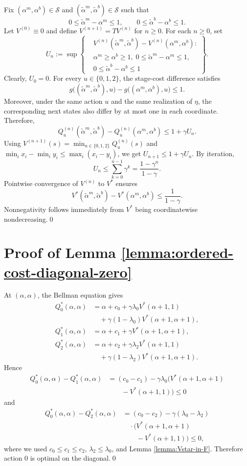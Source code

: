 \documentclass[letterpaper,journal]{IEEEtran}
\begin{document}
Fix $(\alpha^m,\alpha^b)\in\mathcal S$ and $(\tilde\alpha^m,\tilde\alpha^b)\in\mathcal S$ such that
\[
0\leq \tilde\alpha^m-\alpha^m\leq 1,\qquad 0\leq \tilde\alpha^b-\alpha^b\leq 1.
\]
Let $V^{(0)}\equiv 0$ and define $V^{(n+1)}=TV^{(n)}$ for $n\geq 0$. For each $n\geq 0$, set
\[
U_n:=\sup\left\{
\begin{aligned}
&V^{(n)}(\tilde\alpha^m,\tilde\alpha^b)-V^{(n)}(\alpha^m,\alpha^b):\\
&\alpha^m\geq \alpha^b\geq 1,\;
0\leq \tilde\alpha^m-\alpha^m\leq 1,\\
&0\leq \tilde\alpha^b-\alpha^b\leq 1
\end{aligned}
\right\}.
\]
Clearly, $U_0=0$. For every $u\in\{0,1,2\}$, the stage-cost difference satisfies
\[
g\bigl((\tilde\alpha^m,\tilde\alpha^b),u\bigr)-g\bigl((\alpha^m,\alpha^b),u\bigr)\leq 1.
\]
Moreover, under the same action $u$ and the same realization of $\eta$, the corresponding next states also differ by at most one in each coordinate. Therefore,
\[
Q_u^{(n)}(\tilde\alpha^m,\tilde\alpha^b)-Q_u^{(n)}(\alpha^m,\alpha^b)\leq 1+\gamma U_n.
\]
Using $V^{(n+1)}(s)=\min_{u\in\{0,1,2\}} Q_u^{(n)}(s)$ and $\min_i x_i-\min_i y_i\leq \max_i (x_i-y_i)$, we get $U_{n+1}\leq 1+\gamma U_n$. By iteration,
\[
U_n\leq \sum_{k=0}^{n-1}\gamma^k=\frac{1-\gamma^n}{1-\gamma}.
\]
Pointwise convergence of $V^{(n)}$ to $V^*$ ensures
\[
V^*(\tilde\alpha^m,\tilde\alpha^b)-V^*(\alpha^m,\alpha^b)\leq \frac{1}{1-\gamma}.
\]
Nonnegativity follows immediately from $V^*$ being coordinatewise nondecreasing.\qed


\section{Proof of Lemma \ref{lemma:ordered-cost-diagonal-zero}}
\label{app:ordered-cost-diagonal-zero}


At $(\alpha,\alpha)$, the Bellman equation gives
\begin{align*}
Q_0^*(\alpha,\alpha)
&=\alpha+c_0+\gamma\lambda_0V^*(\alpha+1,1)\\
&\quad+\gamma(1-\lambda_0)V^*(\alpha+1,\alpha+1),\\
Q_1^*(\alpha,\alpha)
&=\alpha+c_1+\gamma V^*(\alpha+1,\alpha+1),\\
Q_2^*(\alpha,\alpha)
&=\alpha+c_2+\gamma\lambda_2V^*(\alpha+1,1)\\
&\quad+\gamma(1-\lambda_2)V^*(\alpha+1,\alpha+1).
\end{align*}
Hence
\[
\begin{aligned}
Q_0^*(\alpha,\alpha)-Q_1^*(\alpha,\alpha)
&=(c_0-c_1)-\gamma\lambda_0\bigl(V^*(\alpha+1,\alpha+1)\\
&\qquad -V^*(\alpha+1,1)\bigr)\leq 0
\end{aligned}
\]
and
\[
\begin{aligned}
Q_0^*(\alpha,\alpha)-Q_2^*(\alpha,\alpha)
&=(c_0-c_2)-\gamma(\lambda_0-\lambda_2)\\
&\quad\cdot\bigl(V^*(\alpha+1,\alpha+1)\\
&\qquad -V^*(\alpha+1,1)\bigr)\leq 0,
\end{aligned}
\]
where we used $c_0\leq c_1\leq c_2$, $\lambda_2\leq \lambda_0$, and Lemma \ref{lemma:Vstar-in-F}. Therefore action $0$ is optimal on the diagonal.\qed
\end{document}
